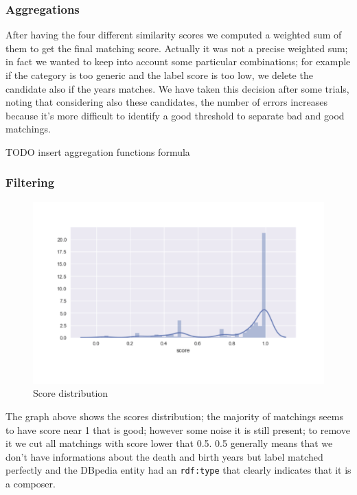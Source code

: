 \documentclass[paper=a4, fontsize=11pt]{scrartcl}
\begin{document}
\subsubsection{Aggregations}

After having the four different similarity scores we computed a weighted sum of them  to get the final matching score. Actually it was not a precise weighted sum; in fact we wanted to keep into account some particular combinations; for example if the category is too generic and the label score is too low, we delete the candidate also if the years matches. We have taken this decision after some trials, noting that considering also these candidates, the number of errors increases because it's more difficult to identify a good threshold to separate bad and good matchings.

TODO insert aggregation functions formula

\subsubsection{Filtering}

\begin{figure}[!htb]
  \centering 
    \includegraphics[width=1\textwidth]{images/score_distribution.jpg}
    \caption{Score distribution}
\end{figure}

The graph above shows the scores distribution; the majority of matchings seems to have score near 1 that is good; however some noise it is still present; to remove it we cut all matchings with score lower that 0.5. 0.5 generally means that we don't have informations about the death and birth years but label matched perfectly and the DBpedia entity had an \verb|rdf:type| that clearly indicates that it is a composer.
\end{document}
